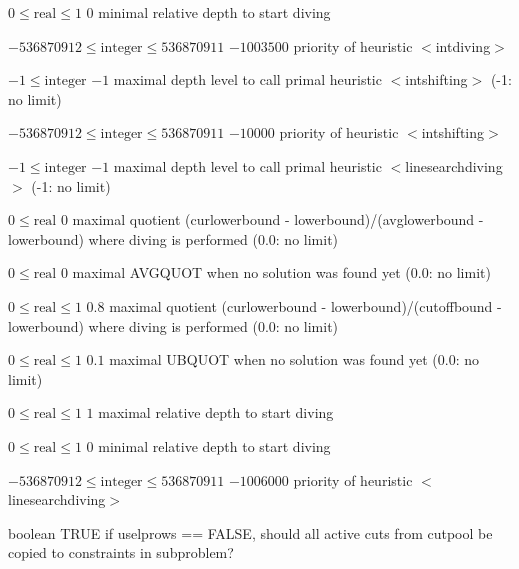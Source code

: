 %
{$0\leq\textrm{real}\leq1$}%
{$0$}%
{minimal relative depth to start diving}%
{}

%
{$-536870912\leq\textrm{integer}\leq536870911$}%
{$-1003500$}%
{priority of heuristic $<$intdiving$>$}%
{}

%
{$-1\leq\textrm{integer}$}%
{$-1$}%
{maximal depth level to call primal heuristic $<$intshifting$>$ (-1: no limit)}%
{}

%
{$-536870912\leq\textrm{integer}\leq536870911$}%
{$-10000$}%
{priority of heuristic $<$intshifting$>$}%
{}

%
{$-1\leq\textrm{integer}$}%
{$-1$}%
{maximal depth level to call primal heuristic $<$linesearchdiving$>$ (-1: no limit)}%
{}

%
{$0\leq\textrm{real}$}%
{$0$}%
{maximal quotient (curlowerbound - lowerbound)/(avglowerbound - lowerbound) where diving is performed (0.0: no limit)}%
{}

%
{$0\leq\textrm{real}$}%
{$0$}%
{maximal AVGQUOT when no solution was found yet (0.0: no limit)}%
{}

%
{$0\leq\textrm{real}\leq1$}%
{$0.8$}%
{maximal quotient (curlowerbound - lowerbound)/(cutoffbound - lowerbound) where diving is performed (0.0: no limit)}%
{}

%
{$0\leq\textrm{real}\leq1$}%
{$0.1$}%
{maximal UBQUOT when no solution was found yet (0.0: no limit)}%
{}

%
{$0\leq\textrm{real}\leq1$}%
{$1$}%
{maximal relative depth to start diving}%
{}

%
{$0\leq\textrm{real}\leq1$}%
{$0$}%
{minimal relative depth to start diving}%
{}

%
{$-536870912\leq\textrm{integer}\leq536870911$}%
{$-1006000$}%
{priority of heuristic $<$linesearchdiving$>$}%
{}

%
{boolean}%
{TRUE}%
{if uselprows == FALSE, should all active cuts from cutpool be copied to constraints in subproblem?}%
{}

